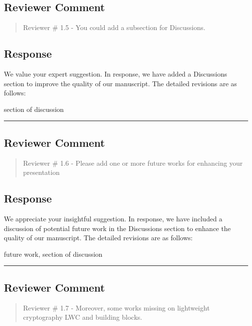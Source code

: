 \subsection{Reviewer Comment}
\begin{mdframed}
	\begin{quote}
		Reviewer \# 1.5 - You could add a subsection for Discussions.
	\end{quote}
\end{mdframed}

\subsection{Response}

We value your expert suggestion. In response, we have added a Discussions section to improve the quality of our manuscript. The detailed revisions are as follows:

\color{blue}
section of discussion

\color{black}

\noindent\rule{\linewidth}{2.0pt}

\subsection{Reviewer Comment}
\begin{mdframed}
	\begin{quote}
		Reviewer \# 1.6 - Please add one or more future works for enhancing your presentation
	\end{quote}
\end{mdframed}

\subsection{Response}

We appreciate your insightful suggestion. In response, we have included a discussion of potential future work in the Discussions section to enhance the quality of our manuscript. The detailed revisions are as follows:

\color{blue}

future work, section of discussion

\color{black}

\noindent\rule{\linewidth}{2.0pt}

\subsection{Reviewer Comment}
\begin{mdframed}
	\begin{quote}
		Reviewer \# 1.7 - Moreover, some works missing on lightweight cryptography LWC and building blocks. 
	\end{quote}
\end{mdframed}


